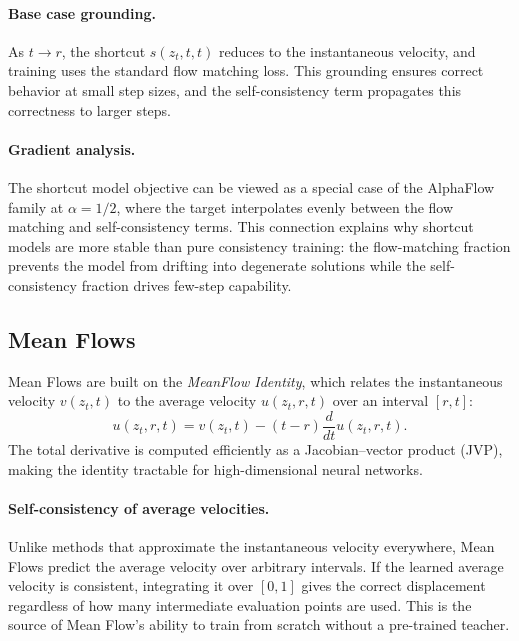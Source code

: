 \paragraph{Base case grounding.} As $t \to r$, the shortcut $s(z_t, t, t)$ reduces to the instantaneous velocity, and training uses the standard flow matching loss. This grounding ensures correct behavior at small step sizes, and the self-consistency term propagates this correctness to larger steps.

\paragraph{Gradient analysis.} The shortcut model objective can be viewed as a special case of the AlphaFlow family at $\alpha = 1/2$, where the target interpolates evenly between the flow matching and self-consistency terms. This connection explains why shortcut models are more stable than pure consistency training: the flow-matching fraction prevents the model from drifting into degenerate solutions while the self-consistency fraction drives few-step capability.


\subsection{Mean Flows}
\label{subsec:theory-meanflow}

Mean Flows are built on the \emph{MeanFlow Identity}, which relates the instantaneous velocity $v(z_t, t)$ to the average velocity $u(z_t, r, t)$ over an interval $[r,t]$:
\begin{equation}
    u(z_t, r, t) = v(z_t, t) - (t-r) \frac{d}{dt} u(z_t, r, t).
\end{equation}
The total derivative is computed efficiently as a Jacobian--vector product (JVP), making the identity tractable for high-dimensional neural networks.

\paragraph{Self-consistency of average velocities.} Unlike methods that approximate the instantaneous velocity everywhere, Mean Flows predict the average velocity over arbitrary intervals. If the learned average velocity is consistent, integrating it over $[0,1]$ gives the correct displacement regardless of how many intermediate evaluation points are used. This is the source of Mean Flow's ability to train from scratch without a pre-trained teacher.

